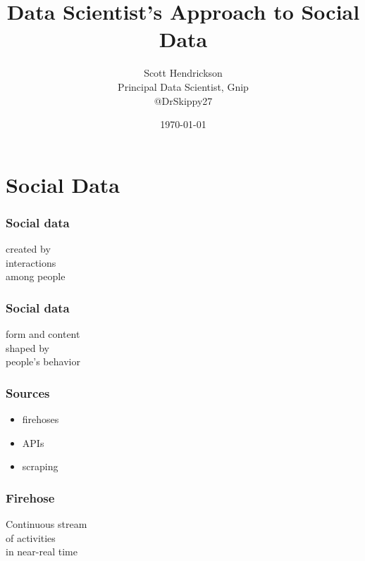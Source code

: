\documentclass{beamer}
\begin{document}
\title{Data Scientist's Approach to Social Data}
\author{Scott Hendrickson \\ Principal Data Scientist, Gnip \\  @DrSkippy27}
\date{\today} 


\begin{frame}
\titlepage
\end{frame}

\section{Social Data}
{
\begin{frame}
\textcolor{black} {
\hfill \Huge \insertsection}
\end{frame}
}

\begin{frame}\frametitle{Social data}
\begin{center}
{\Huge created by \\ [8pt] interactions \\ [15pt] among people}
\end{center}
\end{frame}

\begin{frame}\frametitle{Social data}
\begin{center}
{\Huge form and content \\ [8pt] shaped by \\ [15pt] people's behavior}
\end{center}
\end{frame}

\begin{frame}\frametitle{Sources}
{\Huge
\begin{itemize}
\item firehoses
\item APIs
\item scraping
\end{itemize}
}
\end{frame}


\begin{frame}\frametitle{Firehose}
\begin{center}
{\Huge Continuous stream \\ [8pt] of activities \\ [15pt] in near-real time}
\end{center}
\end{frame}
\end{document}
